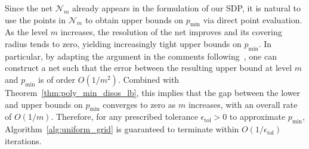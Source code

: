 \documentclass[12pt]{article}
\newcommand{\mcN}{\mathcal{N}}
\theoremstyle{remark}
\begin{document}
Since the net $\mcN_m$ already appears in the formulation of our SDP, it is natural to use the points in $\mcN_m$ to obtain upper bounds on $p_{\min}$ via direct point evaluation. 
As the level $m$ increases, the resolution of the net improves and its covering radius tends to zero, yielding increasingly tight upper bounds on $p_{\min}$. In particular, by adapting the argument in the comments following~\cite[Proposition 4]{vianello_subperiodic_2018}, one can construct a net such that the error between the resulting upper bound at level $m$ and $p_{\min}$ is of order $O(1/m^2)$. Combined with Theorem~\ref{thm:poly_min_disos_lb}, this implies that the gap between the lower and upper bounds on $p_{\min}$ converges to zero as $m$ increases, with an overall rate of $O(1/m)$. Therefore, for any prescribed tolerance $\epsilon_{\text{tol}}>0$ to approximate $p_{\min}$, Algorithm~\ref{alg:uniform_grid} is guaranteed to terminate within $O(1/\epsilon_{\text{tol}})$ iterations. 


\end{document}
